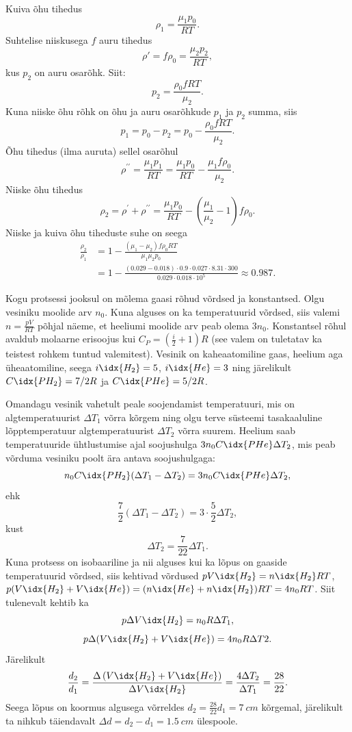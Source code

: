 \documentclass[10pt, twoside]{article}
\begin{document}
{
\solu
Kuiva õhu tihedus
\[
\rho_1 = \frac{\mu_1p_0}{RT}.
\]
Suhtelise niiskusega $f$ auru tihedus
\[
\rho' = f \rho_0 = \frac{\mu_2p_2}{RT},
\]
kus $p_2$ on auru osarõhk. Siit:
\[
p_2 = \frac{\rho_0fRT}{\mu_2}.
\]
Kuna niiske õhu rõhk on õhu ja auru osarõhkude $p_1$ ja $p_2$ summa, siis
\[
p_1 = p_0 - p_2 = p_0 - \frac{\rho_0fRT}{\mu_2}.
\]
Õhu tihedus (ilma auruta) sellel osarõhul
\[
\rho^{\prime \prime}=\frac{\mu_{1} p_{1}}{R T}=\frac{\mu_{1} p_{0}}{R T}-\frac{\mu_{1} f \rho_{0}}{\mu_{2}}.
\]
Niiske õhu tihedus
\[
\rho_{2}=\rho^{\prime}+\rho^{\prime \prime}=\frac{\mu_{1} p_{0}}{R T}-\left(\frac{\mu_{1}}{\mu_{2}}-1\right) f \rho_{0}.
\]
Niiske ja kuiva õhu tiheduste suhe on seega
\[
\begin{aligned}
\frac{\rho_{2}}{\rho_{1}}&=1-\frac{\left(\mu_{1}-\mu_{2}\right) f \rho_{0} R T}{\mu_{1} \mu_{2} p_{0}} \\ 
&=1-\frac{(\num{0,029}-\num{0,018}) \cdot \num{0,9} \cdot \num{0,027} \cdot \num{8,31} \cdot 300}{\num{0,029} \cdot \num{0,018} \cdot 10^{5}} \approx \num{0,987}.
\end{aligned}
\]
\probend
\bigskip


\solu
Kogu protsessi jooksul on mõlema gaasi rõhud võrdsed ja konstantsed. Olgu vesiniku moolide arv $n_0$. Kuna alguses on ka temperatuurid võrdsed, siis valemi $n = \frac{pV}{RT}$ põhjal näeme, et heeliumi moolide arv peab olema $3n_0$. Konstantsel rõhul avaldub molaarne erisoojus kui $C_P = \left(\frac{i}{2} + 1\right) R$ (see valem on tuletatav ka teistest rohkem tuntud valemitest). Vesinik on kaheaatomiline gaas, heelium aga üheaatomiline, seega $i\idx{H_2} = 5$, $i\idx{He} = 3$ ning järelikult $C\idx{PH_2} = 7/2R$ ja $C\idx{PHe} = 5/2R$.

Omandagu vesinik vahetult peale soojendamist temperatuuri, mis on algtemperatuurist $\Delta T_1$ võrra kõrgem ning olgu terve süsteemi tasakaaluline lõpptemperatuur algtemperatuurist $\Delta T_2$ võrra suurem. Heelium saab temperatuuride ühtlustumise ajal soojushulga $3n_0C\idx{PHe}\Delta T_2$, mis peab võrduma vesiniku poolt ära antava soojushulgaga:
\[
n_0C\idx{PH_2} (\Delta T_1 - \Delta T_2) = 3n_0C\idx{PHe}\Delta T_2,
\]
ehk
\[
\frac{7}{2} (\Delta T_1 - \Delta T_2) = 3 \cdot \frac{5}{2} \Delta T_2,
\]
kust
\[
\Delta T_2 = \frac{7}{22} \Delta T_1.
\]
Kuna protsess on isobaariline ja nii alguses kui ka lõpus on gaaside temperatuurid võrdsed, siis kehtivad võrdused $pV\idx{H_2} = n\idx{H_2}RT$, $p(V\idx{H_2} + V\idx{He}) = (n\idx{He} + n\idx{H_2} )RT = 4n_0RT$. Siit tulenevalt kehtib ka
\[
p\Delta V\idx{H_2} = n_0R\Delta T_1,
\]
\[
p\Delta (V\idx{H_2} + V\idx{He}) = 4n_0R\Delta T2.
\]
Järelikult
\[
\frac{d_{2}}{d_{1}}=\frac{\Delta\left(V\idx{H_{2}}+V\idx{H e}\right)}{\Delta V\idx{H_{2}}}=\frac{4 \Delta T_{2}}{\Delta T_{1}}=\frac{28}{22}.
\]
Seega lõpus on koormus algusega võrreldes $d_2 = \frac{28}{22} d_1 = \SI{7}{cm}$ kõrgemal, järelikult ta nihkub täiendavalt $\Delta d = d_2 - d_1 = \SI{1,5}{cm}$ ülespoole.
\probend
\bigskip

}
\end{document}
